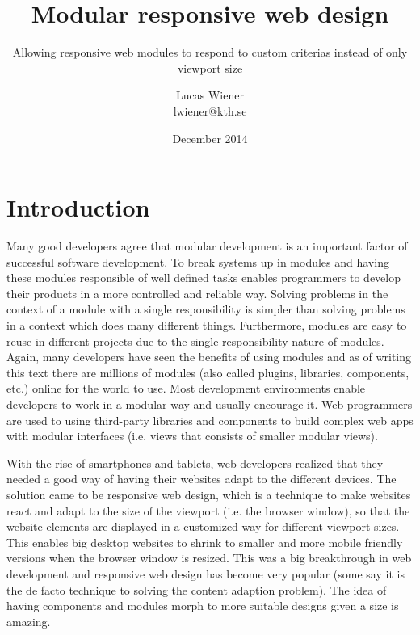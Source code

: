 \documentclass[oneside,a4paper,11pt]{kth-mag}
\title{Modular responsive web design}
\subtitle{Allowing responsive web modules to respond to custom criterias instead of only viewport size}
\author{Lucas Wiener \\ \lowercase{lwiener@kth.se}}
\date{December 2014}
\begin{document}
\frontmatter
\pagestyle{empty}
\removepagenumbers
\maketitle
\mainmatter
\section*{Introduction}

Many good developers agree that modular development is an important factor of successful software development. To break systems up in modules and having these modules responsible of well defined tasks enables programmers to develop their products in a more controlled and reliable way. Solving problems in the context of a module with a single responsibility is simpler than solving problems in a context which does many different things. Furthermore, modules are easy to reuse in different projects due to the single responsibility nature of modules. Again, many developers have seen the benefits of using modules and as of writing this text there are millions of modules (also called plugins, libraries, components, etc.) online for the world to use. Most development environments enable developers to work in a modular way and usually encourage it. Web programmers are used to using third-party libraries and components to build complex web apps with modular interfaces (i.e. views that consists of smaller modular views).

With the rise of smartphones and tablets, web developers realized that they needed a good way of having their websites adapt to the different devices. The solution came to be responsive web design, which is a technique to make websites react and adapt to the size of the viewport (i.e. the browser window), so that the website elements are displayed in a customized way for different viewport sizes. This enables big desktop websites to shrink to smaller and more mobile friendly versions when the browser window is resized. This was a big breakthrough in web development and responsive web design has become very popular (some say it is the de facto technique to solving the content adaption problem). The idea of having components and modules morph to more suitable designs given a size is amazing.
\end{document}
